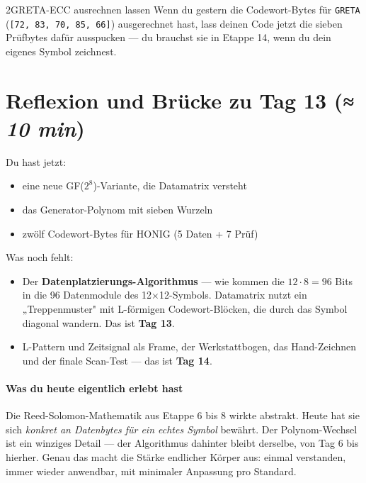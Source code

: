 \begin{bleistiftuebung}{2}{GRETA-ECC ausrechnen lassen}
Wenn du gestern die Codewort-Bytes für \texttt{GRETA}
(\texttt{[72, 83, 70, 85, 66]}) ausgerechnet hast, lass deinen
Code jetzt die sieben Prüfbytes dafür ausspucken — du brauchst sie
in Etappe 14, wenn du dein eigenes Symbol zeichnest.
\end{bleistiftuebung}

\section{Reflexion und Brücke zu Tag 13 \normalfont(\textit{≈ 10 min})}

Du hast jetzt:

\begin{itemize}
\item eine neue GF($2^8$)-Variante, die Datamatrix versteht
\item das Generator-Polynom mit sieben Wurzeln
\item zwölf Codewort-Bytes für HONIG (5 Daten + 7 Prüf)
\end{itemize}

Was noch fehlt:

\begin{itemize}
\item Der \textbf{Datenplatzierungs-Algorithmus} — wie kommen die
  $12 \cdot 8 = 96$ Bits in die 96 Datenmodule des
  12$\times$12-Symbols. Datamatrix nutzt ein „Treppenmuster" mit
  L-förmigen Codewort-Blöcken, die durch das Symbol diagonal wandern.
  Das ist \textbf{Tag 13}.
\item L-Pattern und Zeitsignal als Frame, der Werkstattbogen, das
  Hand-Zeichnen und der finale Scan-Test — das ist \textbf{Tag 14}.
\end{itemize}

\paragraph{Was du heute eigentlich erlebt hast}
Die Reed-Solomon-Mathematik aus Etappe 6 bis 8 wirkte abstrakt. Heute
hat sie sich \emph{konkret an Datenbytes für ein echtes Symbol}
bewährt. Der Polynom-Wechsel ist ein winziges Detail — der
Algorithmus dahinter bleibt derselbe, von Tag 6 bis hierher. Genau
das macht die Stärke endlicher Körper aus: einmal verstanden, immer
wieder anwendbar, mit minimaler Anpassung pro Standard.
